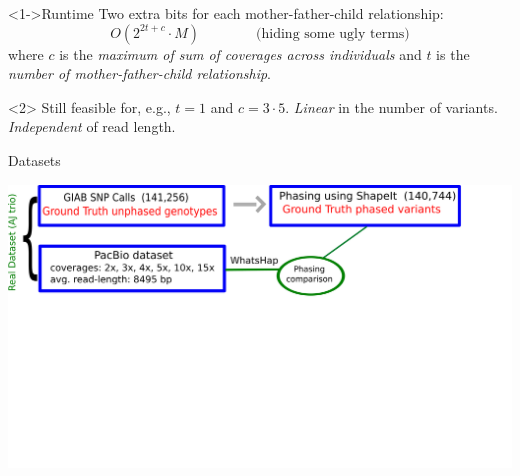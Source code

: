 \documentclass[notes=hide]{beamer}
\begin{document}
\begin{frame}{}
	\begin{block}<1->{Runtime}
		Two extra bits for each mother-father-child relationship:
\[O(2^{2t+c}\cdot M)\qquad\qquad\text{(hiding some ugly terms)}\]
		where $c$ is the \emph{maximum of sum of coverages across individuals} and $t$ is the \emph{number of mother-father-child relationship}.
	\end{block}
	\begin{block}{}
		Still feasible for, e.g., $t=1$ and $c=3\cdot 5$. 
		\emph{Linear} in the number of variants.
		\emph{Independent} of read length.
	\end{block}
\end{frame}

%
\begin{frame}{Datasets}
	\begin{center}
		\includegraphics[scale=0.1]{figs/flowdiagram1}
	\end{center}

\end{frame}
\end{document}
